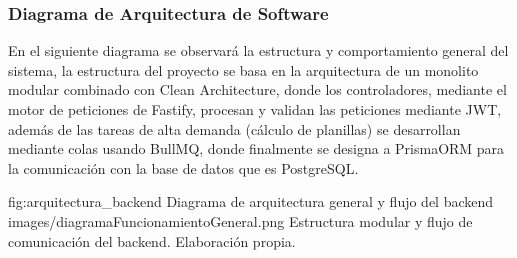 \subsubsection{Diagrama de Arquitectura de Software}
En el siguiente diagrama se observará la estructura y comportamiento general del sistema, la estructura del proyecto se basa en la arquitectura de un monolito modular combinado con Clean Architecture, donde los controladores, mediante el motor de peticiones de Fastify, procesan y validan las peticiones mediante JWT, además de las tareas de alta demanda (cálculo de planillas) se desarrollan mediante colas usando BullMQ, donde finalmente se designa a PrismaORM para la comunicación con la base de datos que es PostgreSQL.
\vspace{0.3cm}
\par\medskip
\noindent
\figuraEnTexto
    {fig:arquitectura_backend}
    {Diagrama de arquitectura general y flujo del backend}
    {images/diagramaFuncionamientoGeneral.png}
    {Estructura modular y flujo de comunicación del backend. Elaboración propia.}
\par\medskip
